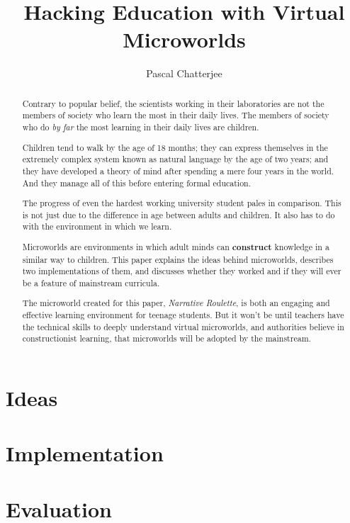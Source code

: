 \documentclass[a4paper]{report}
\title{Hacking Education with Virtual Microworlds}
\author{Pascal Chatterjee}
\begin{document}
\maketitle

\begin{abstract}
Contrary to popular belief, the scientists working in their laboratories are not the members of society who learn the most in their daily lives. The members of society who do \textit{by far} the most learning in their daily lives are children. 

Children tend to walk by the age of 18 months; they can express themselves in the extremely complex system known as natural language by the age of two years; and they have developed a theory of mind after spending a mere four years in the world. And they manage all of this before entering formal education.

The progress of even the hardest working university student pales in comparison. This is not just due to the difference in age between adults and children. It also has to do with the environment in which we learn.

Microworlds are environments in which adult minds can \textbf{construct} knowledge in a similar way to children. This paper explains the ideas behind microworlds, describes two implementations of them, and discusses whether they worked and if they will ever be a feature of mainstream curricula. 

The microworld created for this paper, \textit{Narrative Roulette}, is both an engaging and effective learning environment for teenage students. But it won't be until teachers have the technical skills to deeply understand virtual microworlds, and authorities believe in constructionist learning, that microworlds will be adopted by the mainstream.
\end{abstract}

\tableofcontents

\chapter{Ideas}







\chapter{Implementation}





\chapter{Evaluation}






\end{document}
